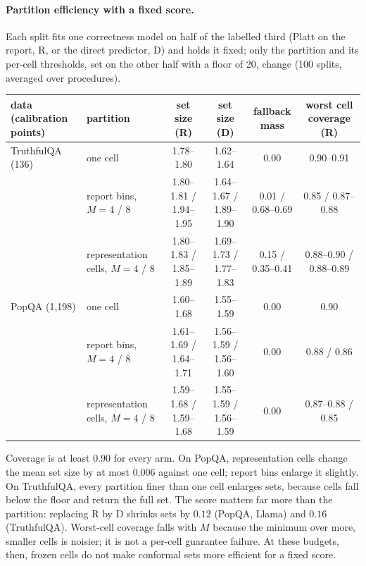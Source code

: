 \documentclass[11pt]{article}
\theoremstyle{definition}
\theoremstyle{remark}
\newcommand{\1}{\mathbf{1}}
\begin{document}
\paragraph{Partition efficiency with a fixed score.} Each split fits one correctness model on half of the
labelled third (Platt on the report, R, or the direct predictor, D) and holds it fixed; only the partition and its
per-cell thresholds, set on the other half with a floor of 20, change (100 splits, averaged over procedures).
\begin{center}\small
\begin{tabular}{llcccc}
\toprule
data (calibration points) & partition & set size (R) & set size (D) & fallback mass & worst cell coverage (R)\\
\midrule
TruthfulQA (136) & one cell & 1.78--1.80 & 1.62--1.64 & 0.00 & 0.90--0.91\\
 & report bins, $M=4$ / 8 & 1.80--1.81 / 1.94--1.95 & 1.64--1.67 / 1.89--1.90 & 0.01 / 0.68--0.69 & 0.85 / 0.87--0.88\\
 & representation cells, $M=4$ / 8 & 1.80--1.83 / 1.85--1.89 & 1.69--1.73 / 1.77--1.83 & 0.15 / 0.35--0.41 & 0.88--0.90 / 0.88--0.89\\
PopQA (1{,}198) & one cell & 1.60--1.68 & 1.55--1.59 & 0.00 & 0.90\\
 & report bins, $M=4$ / 8 & 1.61--1.69 / 1.64--1.71 & 1.56--1.59 / 1.56--1.60 & 0.00 & 0.88 / 0.86\\
 & representation cells, $M=4$ / 8 & 1.59--1.68 / 1.59--1.68 & 1.55--1.59 / 1.56--1.59 & 0.00 & 0.87--0.88 / 0.85\\
\bottomrule
\end{tabular}
\end{center}
Coverage is at least $0.90$ for every arm. On PopQA, representation cells change the mean set size by at
most $0.006$ against one cell; report bins enlarge it slightly. On TruthfulQA, every partition finer than one
cell enlarges sets, because cells fall below the floor and return the full set. The score matters far more
than the partition: replacing R by D shrinks sets by $0.12$ (PopQA, Llama) and $0.16$ (TruthfulQA). Worst-cell
coverage falls with $M$ because the minimum over more, smaller cells is noisier; it is not a per-cell guarantee
failure. At these budgets, then, frozen cells do not make conformal sets more efficient for a fixed score.
\end{document}
